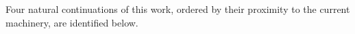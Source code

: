 \documentclass[a4paper]{cas-sc}
\begin{document}
%

Four natural continuations of this work, ordered by their proximity
to the current machinery, are identified below.
\end{document}
